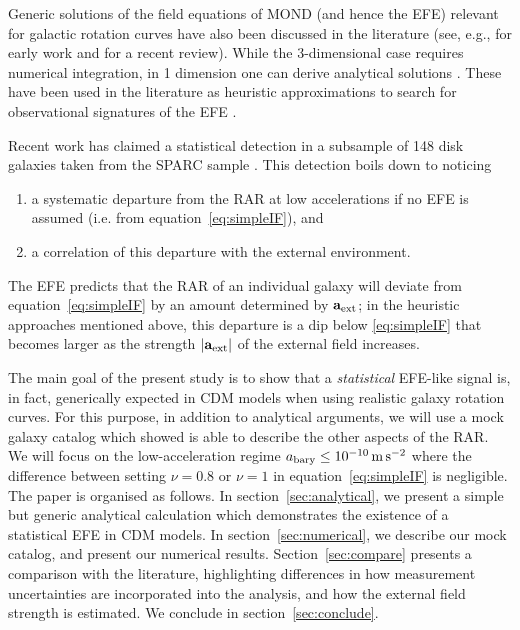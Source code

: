 \documentclass[usenatbib]{mnras}
\newcommand{\abary}{\ensuremath{a_{\rm bary}}}
\newcommand{\aext}{\ensuremath{\mathbf{a}_{\rm ext}}}
\newcommand{\msq}{\ensuremath{{\rm \,m\,s}^{-2}}}
\newcommand{\eqn}[1]{equation~\eqref{#1}}
\begin{document}
Generic solutions of the field equations of MOND (and hence the EFE) relevant for galactic rotation curves have also been discussed in the literature (see, e.g., \citealp{milgrom86} for early work and \citealp{fm12} for a recent review). While the 3-dimensional case requires numerical integration, in 1 dimension one can derive analytical solutions \citep[see, e.g., section~6.3 and equation~59 of][]{fm12}. These have been used in the literature as heuristic approximations to search for observational signatures of the EFE \citep{lelli+15,hbzk16,haghi+19,efe20}.

Recent work has claimed a statistical detection \citep[][hereafter, C20;  see also \citealp{efe-erratum} and \citealp{efe21}]{efe20} in a subsample of 148 disk galaxies taken from the SPARC sample \citep{lms16b}.
This detection boils down to noticing 
 \begin{enumerate}
  \item a systematic departure from the RAR at low accelerations if no EFE is assumed (i.e. from equation~\ref{eq:simpleIF}), and 
  \item a correlation of this departure with the external environment. 
 \end{enumerate}
The EFE predicts that the RAR of an individual galaxy will deviate from \eqn{eq:simpleIF} by an amount determined by $\aext$; in the heuristic approaches mentioned  above, this departure is a dip below \eqref{eq:simpleIF} that becomes larger as the strength $|\aext|$ of the external field increases.

The main goal of the present study is to show that a \emph{statistical} EFE-like signal is, in fact, generically expected in CDM models when using realistic galaxy rotation curves. For this purpose, in addition to analytical arguments, we will use a mock galaxy catalog which  showed is able to describe the other aspects of the RAR. We will focus on the low-acceleration regime $\abary\leq10^{-10}\msq$ where the difference between setting $\nu=0.8$ or $\nu=1$ in \eqn{eq:simpleIF} is negligible. The paper is organised as follows. In section~\ref{sec:analytical}, we present a simple but generic analytical calculation which demonstrates the existence of a statistical EFE in CDM models. In section~\ref{sec:numerical}, we describe our mock catalog, and present our numerical results.  Section~\ref{sec:compare} presents a comparison with the literature, highlighting differences in how measurement uncertainties are incorporated into the analysis, and how the external field strength is estimated.  We conclude in section~\ref{sec:conclude}.  
\end{document}
